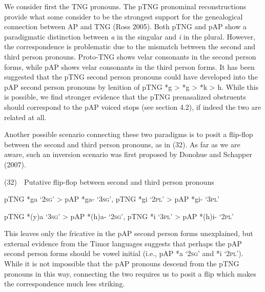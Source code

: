 We consider first the TNG pronouns. The pTNG pronominal reconstructions provide what some consider to be the strongest support for the genealogical connection between AP and TNG (Ross 2005). Both pTNG and pAP show a paradigmatic distinction between \textit{a }in the singular and \textit{i }in the plural. However, the correspondence is problematic due to the mismatch between the second and third person pronouns. Proto-TNG shows velar consonants in the second person forms, while pAP shows velar consonants in the third person forms. It has been suggested that the pTNG second person pronouns could have developed into the pAP second person pronouns by lenition of pTNG *{\ng}g {\textgreater} *g {\textgreater} *k {\textgreater} h. While this is possible, we find stronger evidence that the pTNG prenasalized obstruents should correspond to the pAP voiced stops (see section 4.2), if indeed the two are related at all. 

Another possible scenario connecting these two paradigms is to posit a flip-flop between the second and third person pronouns, as in (32). As far as we are aware, such an inversion scenario was first proposed by Donohue and Schapper (2007).

(32)\ \ Putative flip-flop between second and third person pronouns

pTNG *{\ng}ga {\textquoteleft}\textsc{2sg}{\textquoteright} {\textgreater} pAP *ga- {\textquoteleft}\textsc{3sg}{\textquoteright}, pTNG *{\ng}gi {\textquoteleft}\textsc{2pl}{\textquoteright} {\textgreater} pAP *gi- {\textquoteleft}\textsc{3pl}{\textquoteright}

pTNG *(y)a {\textquoteleft}\textsc{3sg}{\textquoteright} {\textgreater} pAP *(h)a- {\textquoteleft}\textsc{2sg}{\textquoteright}, pTNG *i {\textquoteleft}\textsc{3pl}{\textquoteright} {\textgreater} pAP *(h)i- {\textquoteleft}\textsc{2pl}{\textquoteright}

This leaves only the fricative in the pAP second person forms unexplained, but external evidence from the Timor languages suggests that perhaps the pAP second person forms should be vowel initial (i.e., pAP *a {\textquoteleft}\textsc{2sg{\textquoteright}} and *i {\textquoteleft}\textsc{2pl{\textquoteright}}). While it is not impossible that the pAP pronouns descend from the pTNG pronouns in this way, connecting the two requires us to posit a flip which makes the correspondence much less striking.  

